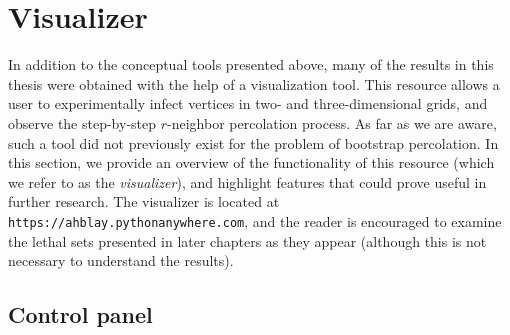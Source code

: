 \section{Visualizer}

In addition to the conceptual tools presented above, many of the results in this thesis were obtained with the help of a visualization tool. This resource allows a user to experimentally infect vertices in two- and three-dimensional grids, and observe the step-by-step $r$-neighbor percolation process. As far as we are aware, such a tool did not previously exist for the problem of bootstrap percolation. In this section, we provide an overview of the functionality of this resource (which we refer to as the \emph{visualizer}), and highlight features that could prove useful in further research. The visualizer is located at \texttt{https://ahblay.pythonanywhere.com}, and the reader is encouraged to examine the lethal sets presented in later chapters as they appear (although this is not necessary to understand the results).

\subsection{Control panel}


